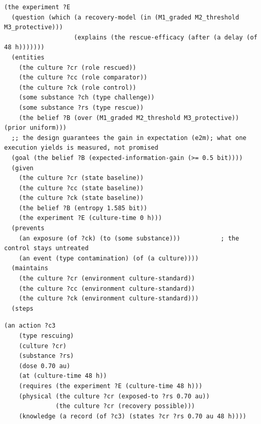 \documentclass[10pt,a4paper]{article}
\begin{document}
\begin{listing}[tbp]
\begin{Verbatim}[fontsize=\footnotesize,breaklines,frame=lines,framesep=2mm]
(the experiment ?E
  (question (which (a recovery-model (in (M1_graded M2_threshold M3_protective)))
                   (explains (the rescue-efficacy (after (a delay (of 48 h)))))))
  (entities
    (the culture ?cr (role rescued))
    (the culture ?cc (role comparator))
    (the culture ?ck (role control))
    (some substance ?ch (type challenge))
    (some substance ?rs (type rescue))
    (the belief ?B (over (M1_graded M2_threshold M3_protective)) (prior uniform)))
  ;; the design guarantees the gain in expectation (e2m); what one execution yields is measured, not promised
  (goal (the belief ?B (expected-information-gain (>= 0.5 bit))))
  (given
    (the culture ?cr (state baseline))
    (the culture ?cc (state baseline))
    (the culture ?ck (state baseline))
    (the belief ?B (entropy 1.585 bit))
    (the experiment ?E (culture-time 0 h)))
  (prevents
    (an exposure (of ?ck) (to (some substance)))           ; the control stays untreated
    (an event (type contamination) (of (a culture))))
  (maintains
    (the culture ?cr (environment culture-standard))
    (the culture ?cc (environment culture-standard))
    (the culture ?ck (environment culture-standard)))
  (steps
\end{Verbatim}
\caption{Head of the culture plan (\texttt{registry/lab/culture\_\allowbreak{}plan.ldl}).}\label{lst:cplan}
\end{listing}

\begin{listing}[tbp]
\begin{Verbatim}[fontsize=\footnotesize,breaklines,frame=lines,framesep=2mm]
(an action ?c3
    (type rescuing)
    (culture ?cr)
    (substance ?rs)
    (dose 0.70 au)
    (at (culture-time 48 h))
    (requires (the experiment ?E (culture-time 48 h)))
    (physical (the culture ?cr (exposed-to ?rs 0.70 au))
              (the culture ?cr (recovery possible)))
    (knowledge (a record (of ?c3) (states ?cr ?rs 0.70 au 48 h))))
\end{Verbatim}
\caption{A culture-level action: the rescue.}\label{lst:culture}
\end{listing}
\end{document}
